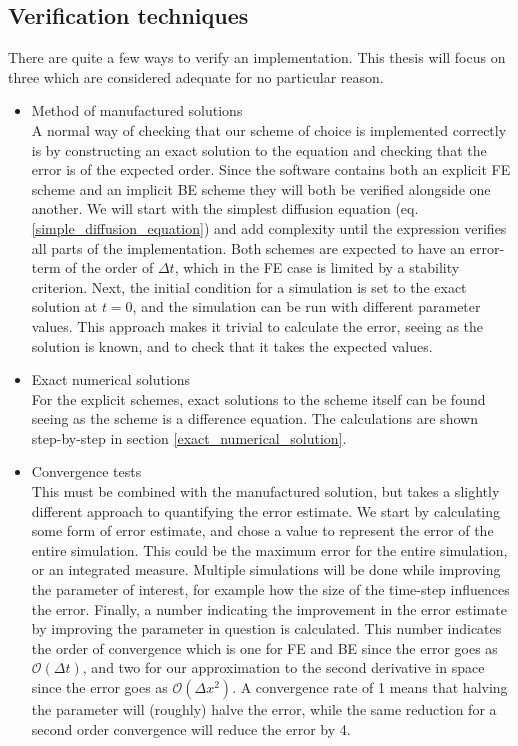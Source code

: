 \subsection{Verification techniques}
There are quite a few ways to verify an implementation. This thesis will focus on three which are considered adequate for no particular reason.
\begin{itemize}
 \item Method of manufactured solutions\\
 A normal way of checking that our scheme of choice is implemented correctly is by constructing an exact solution to the equation and checking that the error is of the expected order. 
Since the software contains both an explicit FE scheme and an implicit BE scheme they will both be verified alongside one another. 
We will start with the simplest diffusion equation (eq. \eqref{simple_diffusion_equation}) and add complexity until the expression verifies all parts of the implementation. 
Both schemes are expected to have an error-term of the order of $\Delta t$, which in the FE case is limited by a stability criterion. 
Next, the initial condition for a simulation is set to the exact solution at $t=0$, and the simulation can be run with different parameter values. 
This approach makes it trivial to calculate the error, seeing as the solution is known, and to check that it takes the expected values.

\item Exact numerical solutions\\
For the explicit schemes, exact solutions to the scheme itself can be found seeing as the scheme is a difference equation. The calculations are shown step-by-step in section \ref{exact_numerical_solution}.
\item Convergence tests\\
This must be combined with the manufactured solution, but takes a slightly different approach to quantifying the error estimate. We start by calculating some form of error estimate, and chose a value to represent the error of the entire simulation. This could be the maximum error for the entire simulation, or an integrated measure. 
Multiple simulations will be done while improving the parameter of interest, for example how the size of the time-step influences the error. 
Finally, a number indicating the improvement in the error estimate by improving the parameter in question is calculated. 
This number indicates the order of convergence which is one for FE and BE since the error goes as $\mathcal{O}(\Delta t)$, and two for our approximation to the second derivative in space since the error goes as $\mathcal O(\Delta x^2)$.
A convergence rate of 1 means that halving the parameter will (roughly) halve the error, while the same reduction for a second order convergence will reduce the error by 4.
\end{itemize}


